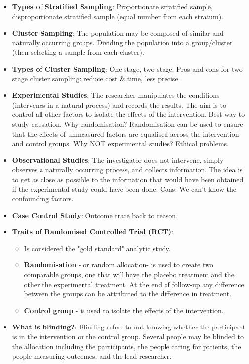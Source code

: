 \documentclass[12pt]{book}
\begin{document}
\begin{itemize}
\item \textbf{Types of Stratified Sampling}: Proportionate stratified sample, disproportionate stratified sample (equal number from each stratum).
\item \textbf{Cluster Sampling}: The population may be composed of similar and naturally occurring groups. Dividing the population into a group/cluster (then selecting a sample from each cluster).
\item \textbf{Types of Cluster Sampling}: One-stage, two-stage. Pros and cons for two-stage cluster sampling: reduce cost \& time, less precise.
\item \textbf{Experimental Studies}: The researcher manipulates the conditions (intervenes in a natural process) and records the results. The aim is to control all other factors to isolate the effects of the intervention. Best way to study causation. Why randomisation? Randomisation can be used to ensure that the effects of unmeasured factors are equalised across the intervention and control groups. Why NOT experimental studies? Ethical problems.
\item \textbf{Observational Studies}: The investigator does not intervene, simply observes a naturally occurring process, and collects information. The idea is to get as close as possible to the information that would have been obtained if the experimental study could have been done. Cons: We can't know the confounding factors.
\item \textbf{Case Control Study}: Outcome trace back to reason.
\item \textbf{Traits of Randomised Controlled Trial (RCT)}: 
	\begin{itemize}
	\item Is considered the "gold standard" analytic study.
	\item \textbf{Randomisation} - or random allocation- is used to create two comparable groups, one that will have the placebo treatment and the other the experimental treatment. At the end of follow-up any difference between the groups can be attributed to the difference in treatment.
	\item \textbf{Control group} - is used to isolate the effects of the intervention.
	\end{itemize}
\item \textbf{What is blinding?}: Blinding refers to not knowing whether the participant is in the intervention or the control group. Several people may be blinded to the allocation including the participants, the people caring for patients, the people measuring outcomes, and the lead researcher.

\end{itemize}
\end{document}
